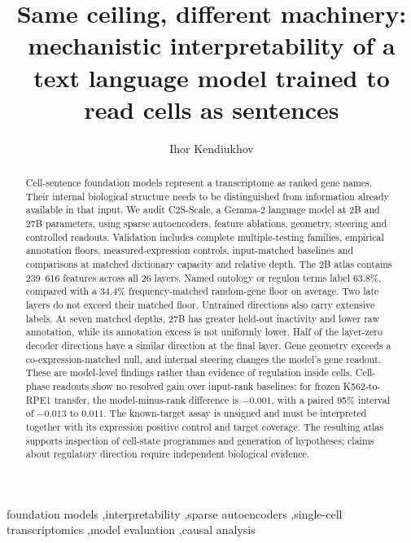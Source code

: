 \documentclass[review,authoryear,12pt]{elsarticle}
\begin{document}
\raggedright

\begin{frontmatter}

\title{Same ceiling, different machinery: mechanistic interpretability of a text
language model trained to read cells as sentences}

\author[tue]{Ihor Kendiukhov}

\begin{abstract}
Cell-sentence foundation models represent a transcriptome as ranked gene names. Their internal
biological structure needs to be distinguished from information already available in that input.
We audit C2S-Scale, a Gemma-2 language model at 2B and 27B parameters, using sparse autoencoders,
feature ablations, geometry, steering and controlled readouts. Validation includes complete
multiple-testing families, empirical annotation floors, measured-expression controls,
input-matched baselines and comparisons at matched dictionary capacity and relative depth.
The 2B atlas contains 239~616 features across all 26 layers. Named ontology or regulon terms
label 63.8\%, compared with a 34.4\% frequency-matched random-gene floor on average. Two late
layers do not exceed their matched floor.
Untrained directions also carry extensive labels. At seven matched depths, 27B has greater
held-out inactivity and lower raw annotation, while its annotation excess is not uniformly lower.
Half of the layer-zero decoder directions have a similar direction at the final layer.
Gene geometry exceeds a co-expression-matched null, and internal steering changes the model's
gene readout. These are model-level findings rather than evidence of regulation inside cells.
Cell-phase readouts show no resolved gain over input-rank baselines: for frozen K562-to-RPE1
transfer, the model-minus-rank difference is $-0.001$, with a paired 95\% interval of
$-0.013$ to $0.011$. The known-target assay is unsigned and must be interpreted together with
its expression positive control and target coverage. The resulting atlas supports inspection of
cell-state programmes and generation of hypotheses; claims about regulatory direction require
independent biological evidence.
\end{abstract}

\begin{keyword}
foundation models \sep interpretability \sep sparse autoencoders \sep single-cell transcriptomics
\sep model evaluation \sep causal analysis
\end{keyword}

\end{frontmatter}
\end{document}
